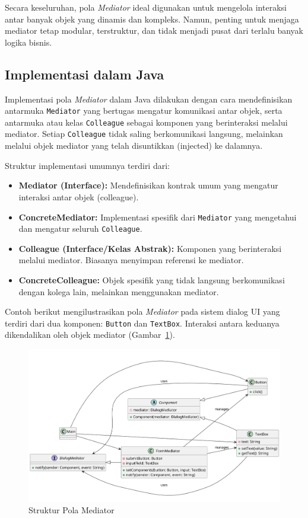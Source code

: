 Secara keseluruhan, pola \textit{Mediator} ideal digunakan untuk mengelola interaksi antar banyak objek yang dinamis dan kompleks. Namun, penting untuk menjaga mediator tetap modular, terstruktur, dan tidak menjadi pusat dari terlalu banyak logika bisnis.



\subsection{Implementasi dalam Java}

Implementasi pola \textit{Mediator} dalam Java dilakukan dengan cara mendefinisikan antarmuka \texttt{Mediator} yang bertugas mengatur komunikasi antar objek, serta antarmuka atau kelas \texttt{Colleague} sebagai komponen yang berinteraksi melalui mediator. Setiap \texttt{Colleague} tidak saling berkomunikasi langsung, melainkan melalui objek mediator yang telah disuntikkan (injected) ke dalamnya.

Struktur implementasi umumnya terdiri dari:
\begin{itemize}
	\item \textbf{Mediator (Interface):} Mendefinisikan kontrak umum yang mengatur interaksi antar objek (colleague).
	\item \textbf{ConcreteMediator:} Implementasi spesifik dari \texttt{Mediator} yang mengetahui dan mengatur seluruh \texttt{Colleague}.
	\item \textbf{Colleague (Interface/Kelas Abstrak):} Komponen yang berinteraksi melalui mediator. Biasanya menyimpan referensi ke mediator.
	\item \textbf{ConcreteColleague:} Objek spesifik yang tidak langsung berkomunikasi dengan kolega lain, melainkan menggunakan mediator.
\end{itemize}

Contoh berikut mengilustrasikan pola \textit{Mediator} pada sistem dialog UI yang terdiri dari dua komponen: \texttt{Button} dan \texttt{TextBox}. Interaksi antara keduanya dikendalikan oleh objek mediator (Gambar~\ref{fig:mediator}).


\begin{figure}[h]
	\centering
	\includegraphics[width=\textwidth]{../figures/out/mediator.png}
	\caption{Struktur Pola Mediator}
	\label{fig:mediator}
\end{figure}


